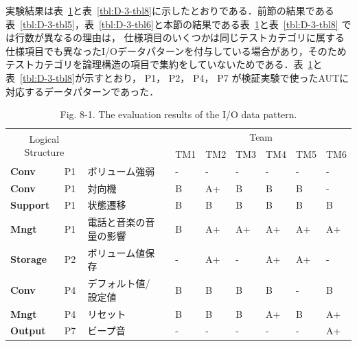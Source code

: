 \documentclass[a4paper,12pt]{jreport}
\begin{document}
  実験結果は表~\ref{tbl:D-3-tbl7}と表~\ref{tbl:D-3-tbl8}に示したとおりである．前節の結果である表~\ref{tbl:D-3-tbl5}，表~\ref{tbl:D-3-tbl6}と本節の結果である表~\ref{tbl:D-3-tbl7}と表~\ref{tbl:D-3-tbl8} では行数が異なるの理由は， 仕様項目のいくつかは同じテストカテゴリに属する仕様項目でも異なったI/Oデータパターンを付与している場合があり，そのためテストカテゴリを論理構造の項目で集約をしていないためである．表~\ref{tbl:D-3-tbl7}と表~\ref{tbl:D-3-tbl8}が示すとおり， P1， P2， P4， P7 が検証実験で使ったAUTに対応するデータパターンであった．

\begin{table}[htbp]
  \centering
  \caption{Fig. 8-1. The evaluation results of the I/O data pattern.}
    \begin{tabular}{|l|l|l|r|l|l|l|l|l|l|}
    \hline
    \multicolumn{2}{|c}{\multirow{2}[4]{*}{Logical
Structure}} & \multicolumn{1}{r}{} &       & \multicolumn{6}{c|}{Team} \bigstrut\\
\cline{5-10}    \multicolumn{2}{|c}{} & \multicolumn{1}{r}{} &       & TM1   & TM2   & TM3   & TM4   & TM5   & TM6 \bigstrut\\
    \hline
    \textbf{Conv} & P1    & ボリューム強弱 &       & -     & -     & -     & -     & -     & - \bigstrut\\
    \hline
    \textbf{Conv} & P1    & 対向機   &       & B     & A+    & B     & B     & B     & - \bigstrut\\
    \hline
    \textbf{Support} & P1    & 状態遷移  &       & B     & B     & B     & B     & B     & B \bigstrut\\
    \hline
    \textbf{Mngt} & P1    & 電話と音楽の音量の影響 &       & B     & A+    & A+    & A+    & A+    & A+ \bigstrut\\
    \hline
    \textbf{Storage} & P2    & ボリューム値保存 &       & -     & A+    & -     & A+    & A+    & - \bigstrut\\
    \hline
    \textbf{Conv} & P4    & デフォルト値/設定値 &       & B     & B     & B     & B     & -     & B \bigstrut\\
    \hline
    \textbf{Mngt} & P4    & リセット  &       & B     & B     & B     & A+    & B     & A+ \bigstrut\\
    \hline
    \textbf{Output} & P7    & ビープ音  &       & -     & -     & -     & -     & -     & A+ \bigstrut\\
    \hline
    \end{tabular}%
  \label{tbl:D-3-tbl7}%
\end{table}%
\end{document}
